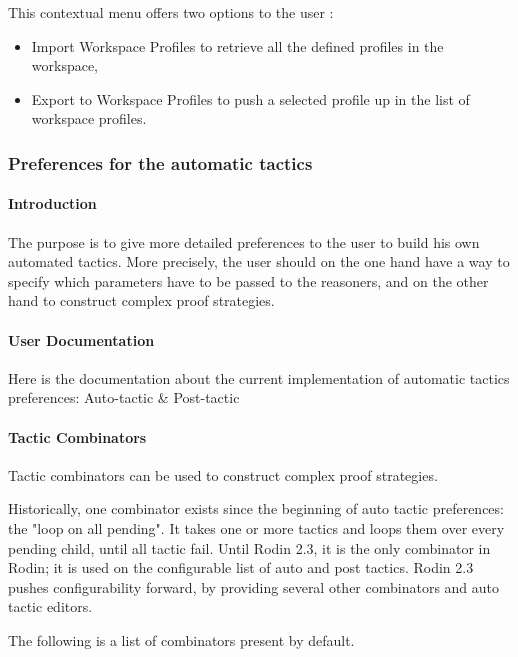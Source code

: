 This contextual menu offers two options to the user :

\begin{itemize}
	\item Import Workspace Profiles to retrieve all the defined profiles in the workspace,
	\item Export to Workspace Profiles to push a selected profile up in the list of workspace profiles.
\end{itemize}

\subsubsection{Preferences for the automatic tactics}

\paragraph{Introduction}

The purpose is to give more detailed preferences to the user to build his own automated tactics. More precisely, the user should on the one hand have a way to specify which parameters have to be passed to the reasoners, and on the other hand to construct complex proof strategies.

\paragraph{User Documentation}

Here is the documentation about the current implementation of automatic tactics preferences: Auto-tactic \& Post-tactic

\paragraph{Tactic Combinators}

Tactic combinators can be used to construct complex proof strategies.

Historically, one combinator exists since the beginning of auto tactic preferences: the "loop on all pending". It takes one or more tactics and loops them over every pending child, until all tactic fail. Until Rodin 2.3, it is the only combinator in Rodin; it is used on the configurable list of auto and post tactics. Rodin 2.3 pushes configurability forward, by providing several other combinators and auto tactic editors.

The following is a list of combinators present by default.

